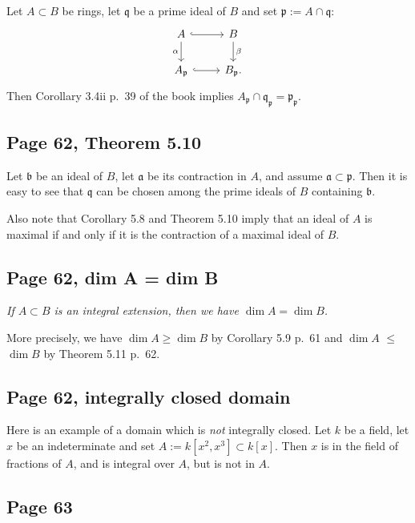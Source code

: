 \documentclass[parskip=half,fontsize=12pt]{scrartcl}%
\newcommand{\mf}{\mathfrak}
\newcommand{\ppp}{\mf p}
\begin{document}
Let $A\subset B$ be rings, let $\mf q$ be a prime ideal of $B$ and set $\ppp:=A\cap\mf q$:
$$
\begin{tikzcd}
A\ar[d,"\alpha"']\ar[r,hook]&B\ar[d,"\beta"]\\ 
A_\ppp\ar[r,hook]&B_\ppp.
\end{tikzcd}
$$
Then Corollary 3.4ii p.~39 of the book implies $A_\ppp\cap\mf q_\ppp=\ppp_\ppp$.

\subsection{Page 62, Theorem 5.10}\label{510}%

Let $\mf b$ be an ideal of $B$, let $\mf a$ be its contraction in $A$, and assume $\mf a\subset\ppp$. Then it is easy to see that $\mf q$ can be chosen among the prime ideals of $B$ containing $\mf b$. 

Also note that Corollary 5.8 and Theorem 5.10 imply that an ideal of $A$ is maximal if and only if it is the contraction of a maximal ideal of $B$. 

\subsection{Page 62, dim A = dim B}%

\emph{If $A\subset B$ is an integral extension, then we have $\dim A=\dim B$.}

More precisely, we have $\dim A\ge\dim B$ by Corollary 5.9 p.~61 and $\dim A$ $\le$ $\dim B$ by Theorem 5.11 p.~62.

\subsection{Page 62, integrally closed domain}%

Here is an example of a domain which is \emph{not} integrally closed. Let $k$ be a field, let $x$ be an indeterminate and set $A:=k[x^2,x^3]\subset k[x]$. Then $x$ is in the field of fractions of $A$, and is integral over $A$, but is not in $A$.

\subsection{Page 63}%
\end{document}
